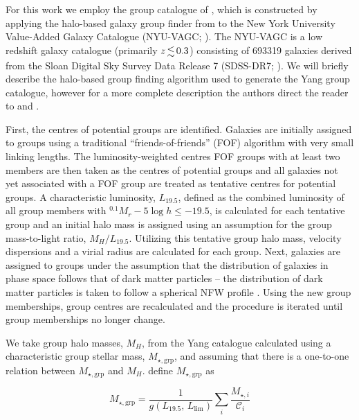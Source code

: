 \documentclass[a4paper,fleqn,usenatbib]{mnras}
\begin{document}
For this work we employ the group catalogue of \citet{yang2007}, which
is constructed by applying the halo-based galaxy group finder from
\citet{yang2005, yang2007} to the New York University Value-Added
Galaxy Catalogue (NYU-VAGC; \citealt{blanton2005}).  The NYU-VAGC is a
low redshift galaxy catalogue (primarily $z \la 0.3$) consisting of
693319 galaxies derived from the Sloan Digital Sky Survey Data Release
7 (SDSS-DR7; \citealt{abazajian2009}).  We will briefly describe the
halo-based group finding algorithm used to generate the Yang group catalogue,
however for a more complete description the authors direct the reader
to \citet{yang2005} and \citet{yang2007}.
\par
First, the centres of potential groups are identified.  Galaxies are
initially assigned to groups using a traditional
``friends-of-friends'' (FOF) algorithm \citep[e.g.][]{huchra1982} with
very small linking lengths.  The luminosity-weighted centres 
FOF groups with at least two members are then taken as the centres of
potential groups and all galaxies not yet associated with a FOF group
are treated as tentative centres for potential groups.  A
characteristic luminosity, $L_{19.5}$, defined as the combined
luminosity of all group members with $^{0.1}M_r - 5\log h \le -19.5$,
is calculated for each tentative group and an initial halo mass is
assigned using an assumption for the group mass-to-light ratio,
$M_H/L_{19.5}$.  Utilizing this tentative group halo mass, velocity
dispersions and a virial radius are calculated for each group.  Next,
galaxies are assigned to groups under the assumption that the
distribution of galaxies in phase space follows that of dark matter
particles -- the distribution of dark matter particles is taken to
follow a spherical NFW profile \citep{navarro1997}.  Using the new
group memberships, group centres are recalculated and the procedure is
iterated until group memberships no longer change.
\par
We take group halo masses, $M_H$, from the Yang catalogue calculated
using a characteristic group stellar mass, $M_{\star,\text{grp}}$, and
assuming that there is a one-to-one relation between $M_{\star,\text{grp}}$
and $M_H$.  \citet{yang2007} define $M_{\star,\text{grp}}$ as

\begin{equation}
  M_{\star,\text{grp}} = \frac{1}{g(L_{19.5},\,L_{\text{lim}})} \sum_i
  \frac{M_{\star,i}}{\mathcal{C}_i}
\end{equation}
\end{document}
